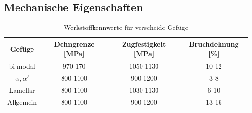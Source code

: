 \documentclass[a4paper, 11pt]{tubsreprt}
\begin{document}
\subsection{Mechanische Eigenschaften}
\begin{table}[h]
\begin{tabular}{c|c|c|c}
Gefüge & Dehngrenze [MPa] & Zugfestigkeit [MPa] & Bruchdehnung [\%] \\
\hline
bi-modal &	970-170 & 1050-1130 & 10-12 \\
\hline
{$\alpha, \alpha'$} & 800-1100 & 900-1200 & 3-8 \\
\hline
Lamellar & 800-1100 & 1030-1130 & 6-10 \\
\hline
Allgemein & 800-1100 & 900-1200 & 13-16 \\

\end{tabular}

\caption[Werkstoffkennwerte für verschiedene Gefüge]{Werkstoffkennwerte für verscheide Gefüge \cite{Chen2008} \cite{Sieniawski2013} \cite{Lee2005}}
\label{Tabelle Spannungen Gefüge}
\end{table}
\end{document}
